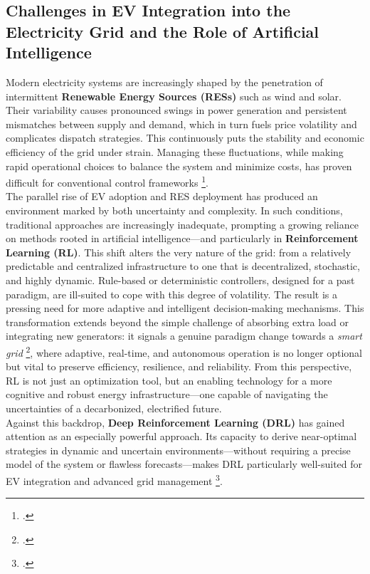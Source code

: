\subsection{Challenges in EV Integration into the Electricity Grid and the Role of Artificial Intelligence} %
Modern electricity systems are increasingly shaped by the penetration of intermittent \textbf{Renewable Energy Sources (RESs)} such as wind and solar. 
Their variability causes pronounced swings in power generation and persistent mismatches between supply and demand, which in turn fuels price volatility and complicates dispatch strategies. 
This continuously puts the stability and economic efficiency of the grid under strain. 
Managing these fluctuations, while making rapid operational choices to balance the system and minimize costs, has proven difficult for conventional control frameworks \footcite{orfanoudakis2022deep, minchala2025systematic}. 
\\
\noindent
The parallel rise of EV adoption and RES deployment has produced an environment marked by both uncertainty and complexity. 
In such conditions, traditional approaches are increasingly inadequate, prompting a growing reliance on methods rooted in artificial intelligence—and particularly in \textbf{Reinforcement Learning (RL)}. 
This shift alters the very nature of the grid: from a relatively predictable and centralized infrastructure to one that is decentralized, stochastic, and highly dynamic. 
Rule-based or deterministic controllers, designed for a past paradigm, are ill-suited to cope with this degree of volatility. 
The result is a pressing need for more adaptive and intelligent decision-making mechanisms. 
This transformation extends beyond the simple challenge of absorbing extra load or integrating new generators: it signals a genuine paradigm change towards a \emph{smart grid} \footcite{alhmoud2024review}, where adaptive, real-time, and autonomous operation is no longer optional but vital to preserve efficiency, resilience, and reliability. 
From this perspective, RL is not just an optimization tool, but an enabling technology for a more cognitive and robust energy infrastructure—one capable of navigating the uncertainties of a decarbonized, electrified future.
\\
\noindent
Against this backdrop, \textbf{Deep Reinforcement Learning (DRL)} has gained attention as an especially powerful approach. 
Its capacity to derive near-optimal strategies in dynamic and uncertain environments—without requiring a precise model of the system or flawless forecasts—makes DRL particularly well-suited for EV integration and advanced grid management \footcite{orfanoudakis2022deep, shibl2023electric}.


